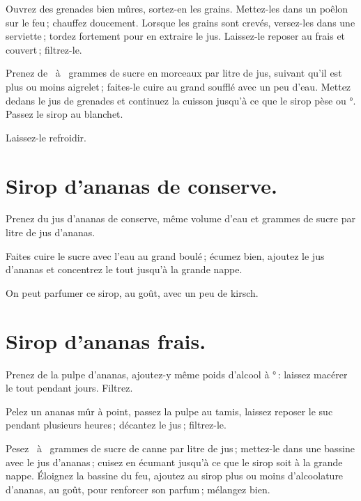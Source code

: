 Ouvrez des grenades bien mûres, sortez-en les grains. Mettez-les dans un poêlon
sur le feu ; chauffez doucement. Lorsque les grains sont crevés, versez-les
dans une serviette ; tordez fortement pour en extraire le jus. Laissez-le
reposer au frais et couvert ; filtrez-le.

Prenez de {\mmm} {\mmm} à {\mmm} {\mmm} grammes de
sucre en morceaux par litre de jus, suivant qu'il est plus ou moins aigrelet ;
faites-le cuire au grand soufflé avec un peu d'eau. Mettez dedans le jus de
grenades et continuez la cuisson jusqu'à ce que le sirop pèse {\mmm} ou
{\mmm}°. Passez le sirop au blanchet.

Laissez-le refroidir.

\section*{\centering Sirop d'ananas de conserve.}
{}

Prenez du jus d’ananas de conserve, même volume d'eau et {\mmm} grammes
de sucre par litre de jus d'ananas.

Faites cuire le sucre avec l'eau au grand boulé ; écumez bien, ajoutez le jus
d'ananas et concentrez le tout jusqu'à la grande nappe.

\medskip

On peut parfumer ce sirop, au goût, avec un peu de kirsch.

\section*{\centering Sirop d'ananas frais.}
{}

Prenez de la pulpe d'ananas, ajoutez-y même poids d'alcool à {\mmm}° :
laissez macérer le tout pendant {\mmm} jours. Filtrez.

Pelez un ananas mûr à point, passez la pulpe au tamis, laissez reposer le suc
pendant plusieurs heures ; décantez le jus ; filtrez-le.

Pesez {\mmm} {\mmm} à {\mmm} {\mmm} grammes de sucre de
canne par litre de jus ; mettez-le dans une bassine avec le jus d’ananas ;
cuisez en écumant jusqu'à ce que le sirop soit à la grande nappe. Éloignez la
bassine du feu, ajoutez au sirop plus ou moins d'alcoolature d'ananas, au goût,
pour renforcer son parfum ; mélangez bien.

